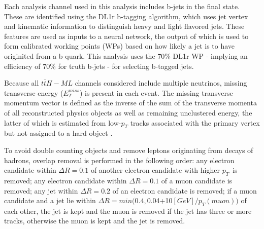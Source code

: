 Each analysis channel used in this analysis includes b-jets in the final state. These are identified using the DL1r b-tagging algorithm, which uses jet vertex and kinematic information to distinguish heavy and light flavored jets. These features are used as inputs to a neural network, the output of which is used to form calibrated working points (WPs) based on how likely a jet is to have originited from a b-quark. This analysis uses the 70\% DL1r WP - implying an efficiency of 70\% for truth b-jets - for selecting b-tagged jets. 

Because all $t\bar{t}H-ML$ channels considered include multiple neutrinos, missing transverse energy ($E_T^{miss}$) is present in each event. The missing transverse momentum vector is defined as the inverse of the sum of the transverse momenta of all reconstructed physics objects as well as remaining unclustered energy, the latter of which is estimated from low-$p_T$ tracks associated with the primary vertex but not assigned to a hard object \cite{ATL-PHYS-PUB-2015-027}.

To avoid double counting objects and remove leptons originating from decays of hadrons, overlap removal is performed in the following order: any electron candidate within $\Delta R = 0.1$ of another electron candidate with higher $p_T$\ is removed; any electron candidate within $\Delta R = 0.1$ of a muon candidate is removed; any jet within $\Delta R = 0.2$ of an electron candidate is removed; if a muon candidate and a jet lie within $\Delta R = min(0.4, $0.04+10$[GeV]/p_T(muon))$ of each other, the jet is kept and the muon is removed if the jet has three or more tracks, otherwise the muon is kept and the jet is removed.
